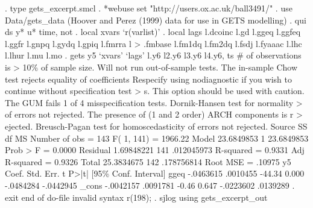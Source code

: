 {\smallskip}
. type gets_excerpt.smcl
{\smallskip}
. *webuse set "http://users.ox.ac.uk/{\tytilde}ball3491/"
. use Data/gets_data
(Hoover and Perez (1999) data for use in GETS modelling)
{\smallskip}
. qui ds y* u* time, not
{\smallskip}
. local xvars `r(varlist)' 
{\smallskip}
. local lags l.dcoinc l.gd l.ggeq l.ggfeq l.ggfr l.gnpq l.gydq l.gpiq l.fmrra l
> .fmbase l.fm1dq l.fm2dq l.fsdj l.fyaaac l.lhc l.lhur l.mu l.mo 
{\smallskip}
. gets y5 `xvars' `lags' l.y6 l2.y6 l3.y6 l4.y6, ts
\# of observations is > 10\% of sample size.  Will not run out-of-sample tests.
The in-sample Chow test rejects equality of coefficients
Respecify using nodiagnostic if you wish to continue without specification test
> s. This option should be used with caution.
{\smallskip}
The GUM fails 1 of 4 misspecification tests.  Dornik-Hansen test for normality 
> of errors not rejected.  The presence of (1 and 2 order) ARCH components is r
> ejected. Breusch-Pagan test for homoscedasticity of errors not rejected.
{\smallskip}
{\smallskip}
      Source {\VBAR}       SS       df       MS              Number of obs =     143
           F(  1,   141) = 1966.22
       Model {\VBAR}  23.6849853     1  23.6849853           Prob > F      =  0.0000
    Residual {\VBAR}  1.69848221   141  .012045973           R-squared     =  0.9331
           Adj R-squared =  0.9326
       Total {\VBAR}  25.3834675   142  .178756814           Root MSE      =  .10975
{\smallskip}
          y5 {\VBAR}      Coef.   Std. Err.      t    P>|t|     [95\% Conf. Interval]
        ggeq {\VBAR}  -.0463615   .0010455   -44.34   0.000    -.0484284   -.0442945
       _cons {\VBAR}  -.0042157   .0091781    -0.46   0.647    -.0223602    .0139289
{\smallskip}
. exit
{\smallskip}
end of do-file
invalid syntax
r(198);
{\smallskip}
. sjlog using gets_excerpt_out
{\smallskip}

